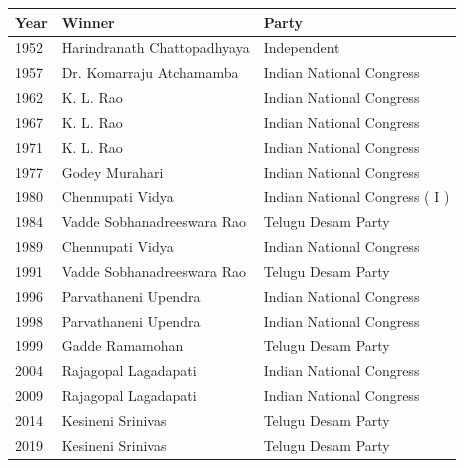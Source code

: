 \documentclass{article}
\begin{document}
\begin{tabular}{lll}
\toprule
Year & Winner & Party \\
\midrule
1952 & Harindranath Chattopadhyaya & Independent \\
1957 & Dr. Komarraju Atchamamba & Indian National Congress \\
1962 & K. L. Rao & Indian National Congress \\
1967 & K. L. Rao & Indian National Congress \\
1971 & K. L. Rao & Indian National Congress \\
1977 & Godey Murahari & Indian National Congress \\
1980 & Chennupati Vidya & Indian National Congress ( I ) \\
1984 & Vadde Sobhanadreeswara Rao & Telugu Desam Party \\
1989 & Chennupati Vidya & Indian National Congress \\
1991 & Vadde Sobhanadreeswara Rao & Telugu Desam Party \\
1996 & Parvathaneni Upendra & Indian National Congress \\
1998 & Parvathaneni Upendra & Indian National Congress \\
1999 & Gadde Ramamohan & Telugu Desam Party \\
2004 & Rajagopal Lagadapati & Indian National Congress \\
2009 & Rajagopal Lagadapati & Indian National Congress \\
2014 & Kesineni Srinivas & Telugu Desam Party \\
2019 & Kesineni Srinivas & Telugu Desam Party \\
\bottomrule
\end{tabular}
\end{document}
